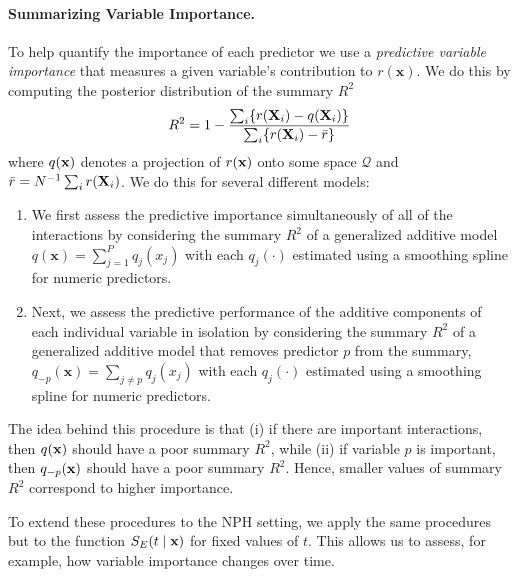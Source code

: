 \documentclass[12pt]{article}
\newcommand{\bx}{\mathbf{x}}
\newcommand{\bfX}{{\bf X}}
\newcommand{\bfx}{{\bf x}}
\begin{document}
\paragraph{Summarizing Variable Importance.}
To help quantify the importance of each predictor we use a \emph{predictive variable importance} that measures a given variable's contribution to $r(\bx)$. We do this by computing the posterior distribution of the summary $R^2$ \citep{woody2020model}
\begin{align*}
    R^2 = 1 - \frac{\sum_i \{r(\bfX_i) - q(\bfX_i)\}}{\sum_i \{r(\bfX_i) - \bar r\}}
\end{align*}
where $q(\bfx)$ denotes a projection of $r(\bfx)$ onto some space $\mathcal Q$ and $\bar r = N^{-1} \sum_i r(\bfX_i)$. We do this for several different models:
\begin{enumerate}
\item We first assess the predictive importance simultaneously of all of the
    interactions by considering the summary $R^2$ of a generalized additive model $q(\bx) = \sum_{j = 1}^P q_j(x_j)$ with each $q_j(\cdot)$ estimated using a smoothing spline for numeric predictors.
    \item Next, we assess the predictive performance of the additive components of each individual variable in isolation by considering the summary $R^2$ of a generalized additive model that removes predictor $p$ from the summary, $q_{-p}(\bx) = \sum_{j \ne p} q_j(x_j)$ with each $q_j(\cdot)$ estimated using a smoothing spline for numeric predictors.
\end{enumerate}
The idea behind this procedure is that (i) if there are important interactions, then $q(\bfx)$ should have a poor summary $R^2$, while (ii) if variable $p$ is important, then $q_{-p}(\bfx)$ should have a poor summary $R^2$. Hence, smaller values of summary $R^2$ correspond to higher importance.

To extend these procedures to the NPH setting, we apply the same procedures but to the function $S_E(t \mid \bfx)$ for fixed values of $t$. This allows us to assess, for example, how variable importance changes over time.
\end{document}
